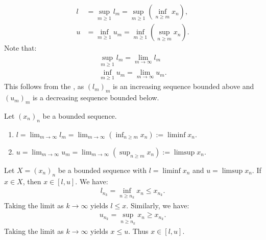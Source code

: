 \begin{example}
\begin{equation*}
            \begin{split}
                l &= \sup_{m \geq 1}l_m = \sup_{m \geq 1}\left(\inf_{n \geq m}x_n\right), \\
                u &= \inf_{m \geq 1}u_m  = \inf_{m \geq 1}\left(\sup_{n \geq m}x_n\right). 
            \end{split}
            \end{equation*}
        Note that:
            \begin{equation*}
            \begin{split}
                \sup_{m \geq 1}l_m = \lim_{m \rightarrow \infty} l_m \\
                \inf_{m \geq 1}u_m = \lim_{m \rightarrow \infty} u_m.
            \end{split}
            \end{equation*}
        This follows from the , as $(l_m)_m$ is an increasing sequence bounded above and $(u_m)_m$ is a decreasing sequence bounded below.
    \end{example}

    \begin{definition}
        Let $(x_n)_n$ be a bounded sequence.
            \begin{enumerate}[label = (\arabic*)]
                \item $\displaystyle l = \lim_{m \rightarrow \infty} l_m = \lim_{m \rightarrow \infty}\left(\inf_{n \geq m}x_n\right) := \liminf x_n$.
                \item $\displaystyle u = \lim_{m \rightarrow \infty} u_m = \lim_{m \rightarrow \infty}\left(\sup_{n \geq m}x_n\right) := \limsup x_n$.
            \end{enumerate}
    \end{definition}

    \begin{proposition}
        Let $X = (x_n)_n$ be a bounded sequence with $l = \liminf x_n$ and $u = \limsup x_n$. If $x \in X$, then $x \in [l,u]$. We have:
            \begin{equation*}
            \begin{split}
                l_{n_k} = \inf_{n \geq n_k}x_n \leq x_{n_k}.
            \end{split}
            \end{equation*}
        Taking the limit as $k\rightarrow \infty$ yields $l \leq x$. Similarly, we have:
            \begin{equation*}
            \begin{split}
                u_{n_k} = \sup_{n \geq n_k}x_n \geq x_{n_k}.
            \end{split}
            \end{equation*}
        Taking the limit as $k \rightarrow \infty$ yields $x \leq u$. Thus $x \in [l,u]$.
    \end{proposition}
